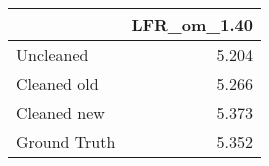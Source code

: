 \begin{tabular}{lr}
\toprule
{} & LFR_om_1.40 \\
\midrule
Uncleaned    &       5.204 \\
Cleaned old  &       5.266 \\
Cleaned new  &       5.373 \\
Ground Truth &       5.352 \\
\bottomrule
\end{tabular}
